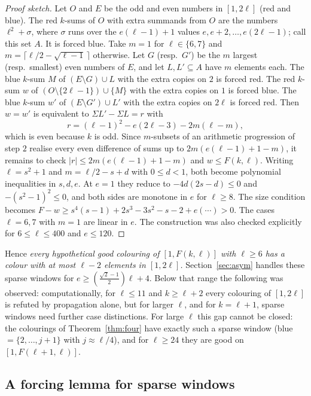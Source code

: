 \documentclass[11pt]{amsart}
\theoremstyle{definition}
\newcommand{\F}{F}
\begin{document}
\begin{proof}[Proof sketch]
Let $O$ and $E$ be the odd and even numbers in $[1,2\ell]$ (red and blue). The red $k$-sums of $O$ with extra summands from $O$ are the numbers $\ell^2+\sigma$, where $\sigma$ runs over the $e(\ell-1)+1$ values $e,e+2,\dots,e(2\ell-1)$; call this set $A$. It is forced blue. Take $m=1$ for $\ell\in\{6,7\}$ and $m=\lceil\ell/2-\sqrt{\ell-1}\,\rceil$ otherwise. Let $G$ (resp.\ $G'$) be the $m$ largest (resp.\ smallest) even numbers of $E$, and let $L,L'\subseteq A$ have $m$ elements each. The blue $k$-sum $M$ of $(E\setminus G)\cup L$ with the extra copies on $2$ is forced red. The red $k$-sum $w$ of $(O\setminus\{2\ell-1\})\cup\{M\}$ with the extra copies on $1$ is forced blue. The blue $k$-sum $w'$ of $(E\setminus G')\cup L'$ with the extra copies on $2\ell$ is forced red. Then $w=w'$ is equivalent to $\Sigma L'-\Sigma L=r$ with
\[
r=(\ell-1)^2-e(2\ell-3)-2m(\ell-m),
\]
which is even because $k$ is odd. Since $m$-subsets of an arithmetic progression of step $2$ realise every even difference of sums up to $2m(e(\ell-1)+1-m)$, it remains to check $|r|\le2m(e(\ell-1)+1-m)$ and $w\le\F(k,\ell)$. Writing $\ell=s^2+1$ and $m=\ell/2-s+d$ with $0\le d<1$, both become polynomial inequalities in $s,d,e$. At $e=1$ they reduce to $-4d(2s-d)\le0$ and $-(s^2-1)^2\le0$, and both sides are monotone in $e$ for $\ell\ge8$. The size condition becomes $\F-w\ge s^4(s-1)+2s^3-3s^2-s-2+e(\cdots)>0$. The cases $\ell=6,7$ with $m=1$ are linear in $e$. The construction was also checked explicitly for $6\le\ell\le400$ and $e\le120$.
\end{proof}

\noindent Hence \emph{every hypothetical good colouring of $[1,\F(k,\ell)]$ with $\ell\ge6$ has a colour with at most $\ell-2$ elements in $[1,2\ell]$.} Section~\ref{sec:asym} handles these sparse windows for $e\ge(\frac{\sqrt2-1}{2})\ell+4$. Below that range the following was observed: computationally, for $\ell\le11$ and $k\ge\ell+2$ every colouring of $[1,2\ell]$ is refuted by propagation alone, but for larger $\ell$, and for $k=\ell+1$, sparse windows need further case distinctions. For large $\ell$ this gap cannot be closed: the colourings of Theorem~\ref{thm:four} have exactly such a sparse window (blue $=\{2,\dots,j+1\}$ with $j\approx\ell/4$), and for $\ell\ge24$ they are good on $[1,\F(\ell+1,\ell)]$.

\subsection*{A forcing lemma for sparse windows}
\end{document}
